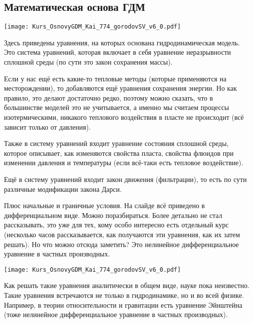 \documentclass[main.tex]{subfiles}
\begin{document}
\subsection{Математическая основа ГДМ}

\texttt{[image: Kurs\_OsnovyGDM\_Kai\_774\_gorodovSV\_v6\_0.pdf]}

Здесь приведены уравнения, на которых основана гидродинамическая модель. 
Это система уравнений, которая включает в себя уравнение неразрывности сплошной среды (по сути это закон сохранения массы).

Если у нас ещё есть какие-то тепловые методы (которые применяются на месторождении), то добавляются ещё уравнения сохранения энергии.
Но как правило, это делают достаточно редко, поэтому можно сказать, что в большинстве моделей это не учитывается, а именно мы считаем процессы изотермическими, никакого теплового воздействия в пласте не происходит (всё зависит только от давления).

Также в систему уравнений входит уравнение состояния сплошной среды, которое описывает, как изменяются свойства пласта, свойства флюидов при изменении давления и температуры (если всё-таки есть тепловое воздействие).

Ещё в систему уравнений входит закон движения (фильтрации), то есть по сути различные модификации закона Дарси.

Плюс начальные и граничные условия. На слайде всё приведено в дифференциальном виде. Можно поразбираться.
Более детально не стал рассказывать, это уже для тех, кому особо интересно есть отдельный курс (несколько часов рассказывается, как получаются эти уравнения, как их затем решать).
Но что можно отсюда заметить? Это нелинейное дифференциальное уравнение в частных производных.

\texttt{[image: Kurs\_OsnovyGDM\_Kai\_774\_gorodovSV\_v6\_0.pdf]}

Как решать такие уравнения аналитически в общем виде, науке пока неизвестно.
Такие уравнения встречаются не только в гидродинамике, но и во всей физике.
Например, в теории относительности и гравитации есть уравнение Эйнштейна (тоже нелинейное дифференциальное уравнение в частных производных).
\end{document}
